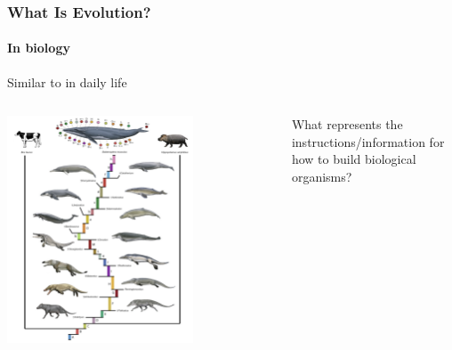 \documentclass[10pt]{beamer}
\begin{document}
\begin{frame}[t]
\frametitle{What Is Evolution?}
\framesubtitle{In biology}
\vspace{0.5cm}

	Similar to in daily life\\
	
	\vspace{0.25cm}
	
	\begin{columns}[t]
		\begin{column}{0.6\textwidth}
			\begin{center}
				\includegraphics[width=0.7\textwidth]{figures/evolution.png}
			\end{center}
		\end{column}	
		
		\begin{column}{0.4\textwidth}
			\begin{center}
				\textcolor{myblue}{What represents the instructions/information for how to build biological organisms?}
			\end{center}
		\end{column}
	\end{columns}
\end{frame}
\end{document}
